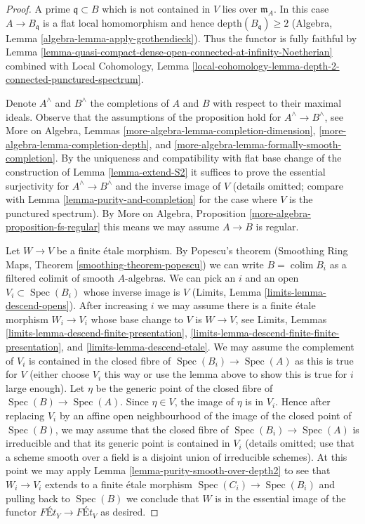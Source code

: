 \documentclass{stacks-project}
\theoremstyle{plain}
\theoremstyle{definition}
\theoremstyle{remark}
\numberwithin{equation}{subsection}
\def\colim{\mathop{\mathrm{colim}}\nolimits}
\def\Spec{\mathop{\mathrm{Spec}}}
\begin{document}
\begin{proof}
A prime $\mathfrak q \subset B$ which is not contained in $V$
lies over $\mathfrak m_A$. In this case $A \to B_\mathfrak q$
is a flat local homomorphism and hence $\text{depth}(B_\mathfrak q) \geq 2$
(Algebra, Lemma \ref{algebra-lemma-apply-grothendieck}).
Thus the functor is fully faithful by
Lemma \ref{lemma-quasi-compact-dense-open-connected-at-infinity-Noetherian}
combined with Local Cohomology,
Lemma \ref{local-cohomology-lemma-depth-2-connected-punctured-spectrum}.

\medskip\noindent
Denote $A^\wedge$ and $B^\wedge$ the completions of $A$ and $B$
with respect to their maximal ideals. Observe that the assumptions
of the proposition hold for $A^\wedge \to B^\wedge$, see
More on Algebra, Lemmas
\ref{more-algebra-lemma-completion-dimension},
\ref{more-algebra-lemma-completion-depth}, and
\ref{more-algebra-lemma-formally-smooth-completion}.
By the uniqueness and compatibility with flat base change
of the construction of  Lemma \ref{lemma-extend-S2}
it suffices to prove the essential surjectivity for
$A^\wedge \to B^\wedge$ and the inverse image of $V$
(details omitted; compare with Lemma \ref{lemma-purity-and-completion}
for the case where $V$ is the punctured spectrum).
By More on Algebra, Proposition \ref{more-algebra-proposition-fs-regular}
this means we may assume $A \to B$ is regular.

\medskip\noindent
Let $W \to V$ be a finite \'etale morphism.
By Popescu's theorem
(Smoothing Ring Maps, Theorem \ref{smoothing-theorem-popescu})
we can write $B = \colim B_i$ as a filtered colimit
of smooth $A$-algebras. We can pick an $i$ and an
open $V_i \subset \Spec(B_i)$ whose inverse image is $V$
(Limits, Lemma \ref{limits-lemma-descend-opens}).
After increasing $i$ we may assume there is a finite
\'etale morphism $W_i \to V_i$ whose base change to $V$
is $W \to V$, see
Limits, Lemmas \ref{limits-lemma-descend-finite-presentation},
\ref{limits-lemma-descend-finite-finite-presentation}, and
\ref{limits-lemma-descend-etale}.
We may assume the complement of $V_i$ is contained
in the closed fibre of $\Spec(B_i) \to \Spec(A)$ as this
is true for $V$ (either choose $V_i$ this way or use
the lemma above to show this is true for $i$ large enough).
Let $\eta$ be the generic point of the closed fibre
of $\Spec(B) \to \Spec(A)$. Since $\eta \in V$, the image of
$\eta$ is in $V_i$. Hence after replacing $V_i$ by an
affine open neighbourhood of the image of the closed point
of $\Spec(B)$, we may assume that the closed fibre
of $\Spec(B_i) \to \Spec(A)$ is irreducible and that
its generic point is contained in $V_i$ (details omitted; use that
a scheme smooth over a field is a disjoint union of irreducible schemes).
At this point we may apply Lemma \ref{lemma-purity-smooth-over-depth2}
to see that $W_i \to V_i$ extends to a finite \'etale
morphism $\Spec(C_i) \to \Spec(B_i)$ and pulling
back to $\Spec(B)$ we conclude that $W$ is in
the essential image of the functor
$\textit{F\'Et}_Y \to \textit{F\'Et}_V$
as desired.
\end{proof}
\end{document}
